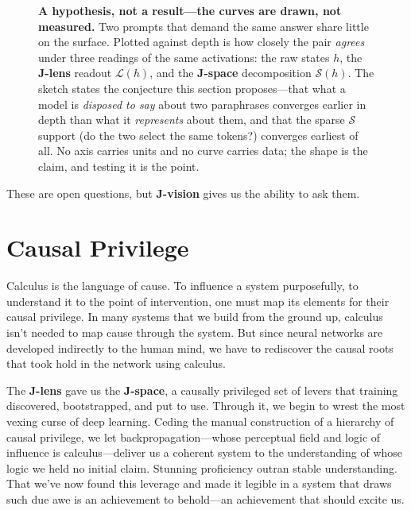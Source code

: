 \documentclass{article}
\newcommand{\jlens}{\mathscr{L}}
\newcommand{\jspace}{\mathscr{S}}
\begin{document}
\begin{figure}[htbp]
{}
\caption{\textbf{A hypothesis, not a result---the curves are drawn, not measured.} Two prompts that
demand the same answer share little on the surface. Plotted against depth is how closely the pair
\emph{agrees} under three readings of the same activations: the raw states $h$, the \textbf{J-lens}
readout $\jlens(h)$, and the \textbf{J-space} decomposition $\jspace(h)$. The sketch states the
conjecture this section proposes---that what a model is \emph{disposed to say} about two paraphrases
converges earlier in depth than what it \emph{represents} about them, and that the sparse $\jspace$
support (do the two select the same tokens?) converges earliest of all. No axis carries units and no
curve carries data; the shape is the claim, and testing it is the point.}
\label{fig:disposition-race}
\end{figure}

These are open questions, but \textbf{J-vision} gives us the ability to ask them. 

\section{Causal Privilege}

Calculus is the language of cause. To influence a system purposefully, to understand it to the point of intervention, one must map its elements for their causal privilege. In many systems that we build from the ground up, calculus isn't needed to map cause through the system. But since neural networks are developed indirectly to the human mind, we have to rediscover the causal roots that took hold in the network using calculus.

The \textbf{J-lens} gave us the \textbf{J-space}, a causally privileged set of levers that training discovered, bootstrapped, and put to use. Through it, we begin to wrest the most vexing curse of deep learning. Ceding the manual construction of a hierarchy of causal privilege, we let backpropagation---whose perceptual field and logic of influence is calculus---deliver us a coherent system to the understanding of whose logic we held no initial claim. Stunning proficiency outran stable understanding. That we've now found this leverage and made it legible in a system that draws such due awe is an achievement to behold---an achievement that should excite us.
\end{document}
